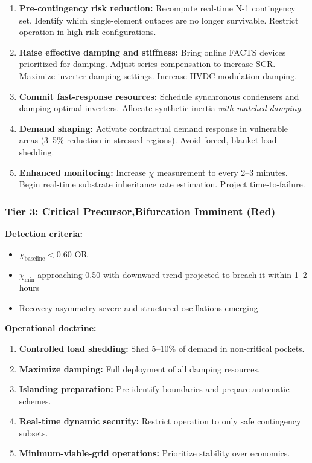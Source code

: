 \documentclass[11pt,letterpaper]{article}
\begin{document}
\begin{enumerate}
\item \textbf{Pre-contingency risk reduction:} Recompute real-time N-1 contingency set. Identify which single-element outages are no longer survivable. Restrict operation in high-risk configurations.

\item \textbf{Raise effective damping and stiffness:} Bring online FACTS devices prioritized for damping. Adjust series compensation to increase SCR. Maximize inverter damping settings. Increase HVDC modulation damping.

\item \textbf{Commit fast-response resources:} Schedule synchronous condensers and damping-optimal inverters. Allocate synthetic inertia \textit{with matched damping}.

\item \textbf{Demand shaping:} Activate contractual demand response in vulnerable areas (3--5\% reduction in stressed regions). Avoid forced, blanket load shedding.

\item \textbf{Enhanced monitoring:} Increase $\chi$ measurement to every 2--3 minutes. Begin real-time substrate inheritance rate estimation. Project time-to-failure.
\end{enumerate}

\subsubsection{Tier 3: Critical Precursor,Bifurcation Imminent (Red)}

\textbf{Detection criteria:}
\begin{itemize}
\item $\chi_{\text{baseline}} < 0.60$ OR
\item $\chi_{\text{min}}$ approaching 0.50 with downward trend projected to breach it within 1--2 hours
\item Recovery asymmetry severe and structured oscillations emerging
\end{itemize}

\textbf{Operational doctrine:}

\begin{enumerate}
\item \textbf{Controlled load shedding:} Shed 5--10\% of demand in non-critical pockets.
\item \textbf{Maximize damping:} Full deployment of all damping resources.
\item \textbf{Islanding preparation:} Pre-identify boundaries and prepare automatic schemes.
\item \textbf{Real-time dynamic security:} Restrict operation to only safe contingency subsets.
\item \textbf{Minimum-viable-grid operations:} Prioritize stability over economics.
\end{enumerate}
\end{document}

